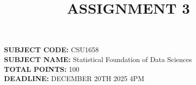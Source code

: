 \documentclass[12pt]{article}
\title{ASSIGNMENT 3}
\author{}
\date{}
\begin{document}
\maketitle

\noindent
\textbf{SUBJECT CODE:} CSU1658 \\
\textbf{SUBJECT NAME:} Statistical Foundation of Data Sciences \\
\textbf{TOTAL POINTS:} 100 \\
\textbf{DEADLINE:} DECEMBER 20TH 2025 4PM
\end{document}

